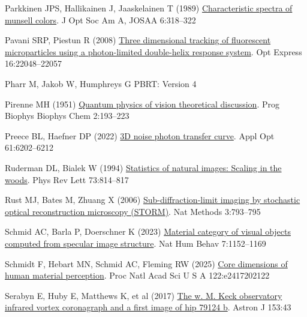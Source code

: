 \documentclass[
  letterpaper,
]{book}
\newlength{\cslhangindent}
\newenvironment{CSLReferences}[2] %
 {\begin{list}{}{%
  \setlength{\itemindent}{0pt}
  \setlength{\leftmargin}{0pt}
  \setlength{\parsep}{0pt}
  \ifodd #1
   \setlength{\leftmargin}{\cslhangindent}
   \setlength{\itemindent}{-1\cslhangindent}
  \fi
  \setlength{\itemsep}{#2\baselineskip}}}
 {\end{list}}
\begin{document}
\begin{CSLReferences}{1}{1}
Parkkinen JPS, Hallikainen J, Jaaskelainen T (1989)
\href{https://opg.optica.org/abstract.cfm?uri=josaa-6-2-318}{Characteristic
spectra of munsell colors}. J Opt Soc Am A, JOSAA 6:318--322

Pavani SRP, Piestun R (2008)
\href{http://dx.doi.org/10.1364/OE.16.022048}{Three dimensional tracking
of fluorescent microparticles using a photon-limited double-helix
response system}. Opt Express 16:22048--22057

Pharr M, Jakob W, Humphreys G {PBRT}: {Version} 4

Pirenne MH (1951)
\href{http://dx.doi.org/10.1016/s0096-4174(18)30026-x}{Quantum physics
of vision theoretical discussion}. Prog Biophys Biophys Chem 2:193--223

Preece BL, Haefner DP (2022)
\href{http://dx.doi.org/10.1364/AO.452166}{{3D} noise photon transfer
curve}. Appl Opt 61:6202--6212

Ruderman DL, Bialek W (1994)
\href{http://dx.doi.org/10.1103/PhysRevLett.73.814}{Statistics of
natural images: Scaling in the woods}. Phys Rev Lett 73:814--817

Rust MJ, Bates M, Zhuang X (2006)
\href{http://dx.doi.org/10.1038/nmeth929}{Sub-diffraction-limit imaging
by stochastic optical reconstruction microscopy ({STORM})}. Nat Methods
3:793--795

Schmid AC, Barla P, Doerschner K (2023)
\href{https://www.nature.com/articles/s41562-023-01601-0}{Material
category of visual objects computed from specular image structure}. Nat
Hum Behav 7:1152--1169

Schmidt F, Hebart MN, Schmid AC, Fleming RW (2025)
\href{http://dx.doi.org/10.1073/pnas.2417202122}{Core dimensions of
human material perception}. Proc Natl Acad Sci U S A 122:e2417202122

Serabyn E, Huby E, Matthews K, et al (2017)
\href{http://dx.doi.org/10.3847/1538-3881/153/1/43}{The w. {M}. Keck
observatory infrared vortex coronagraph and a first image of hip 79124
b}. Astron J 153:43


\end{CSLReferences}
\end{document}

